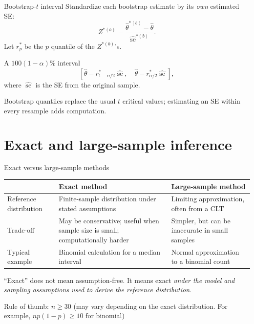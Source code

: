 \documentclass[aspectratio=169,11pt]{beamer}
\begin{document}
\begin{frame}{Bootstrap-\(t\) interval}
  Standardize each bootstrap estimate by its \emph{own} estimated SE:
  \[
    Z^{*(b)}=\frac{\widehat\theta^{*(b)}-\widehat\theta}
                    {\widehat{\operatorname{se}}^{*(b)}}.
  \]
  Let \(r_p^*\) be the \(p\) quantile of the \(Z^{*(b)}\)'s.
  \begin{block}{A \(100(1-\alpha)\%\) interval}
    \[
      \left[\widehat\theta-r_{1-\alpha/2}^*\widehat{\operatorname{se}},\quad
            \widehat\theta-r_{\alpha/2}^*\widehat{\operatorname{se}}\right],
    \]
    where \(\widehat{\operatorname{se}}\) is the SE from the original sample.
  \end{block}
  Bootstrap quantiles replace the usual \(t\) critical values;
  estimating an SE within every resample adds computation.
\end{frame}

\section{Exact and large-sample inference}

\begin{frame}{Exact versus large-sample methods}
  \small
  \begin{tabular}{>{\raggedright\arraybackslash}p{}
                  >{\raggedright\arraybackslash}p{}
                  >{\raggedright\arraybackslash}p{}}
    \toprule
    & \textbf{Exact method} & \textbf{Large-sample method} \\
    \midrule
    Reference distribution & Finite-sample distribution under stated assumptions & Limiting approximation, often from a CLT \\
    Trade-off & May be conservative; useful when sample size is small; computationally harder & Simpler, but can be inaccurate in small samples \\
    Typical example & Binomial calculation for a median interval & Normal approximation to a binomial count \\
    \bottomrule
  \end{tabular}
  \vspace{0.8em}
  ``Exact'' does not mean assumption-free. It means exact \emph{under the model and
  sampling assumptions used to derive the reference distribution}.

  Rule of thumb: $n \geq 30$ (may vary depending on the exact distribution.
  For example, $np(1-p) \geq 10$ for binomial)
\end{frame}
\end{document}
